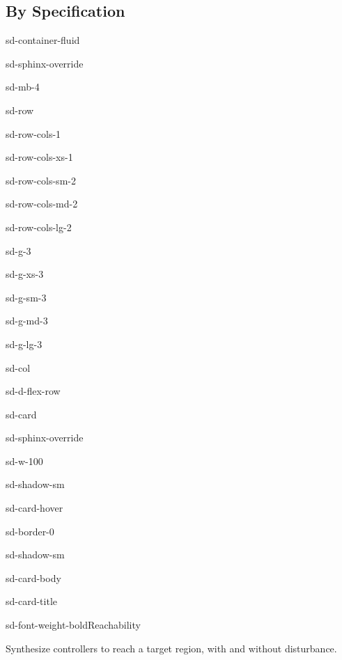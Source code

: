 \documentclass[a4paper,10pt,english]{sphinxmanual}
\begin{document}
\subsection{By Specification}
\label{\detokenize{examples/index:by-specification}}
\begin{sphinxuseclass}{sd-container-fluid}
\begin{sphinxuseclass}{sd-sphinx-override}
\begin{sphinxuseclass}{sd-mb-4}
\begin{sphinxuseclass}{sd-row}
\begin{sphinxuseclass}{sd-row-cols-1}
\begin{sphinxuseclass}{sd-row-cols-xs-1}
\begin{sphinxuseclass}{sd-row-cols-sm-2}
\begin{sphinxuseclass}{sd-row-cols-md-2}
\begin{sphinxuseclass}{sd-row-cols-lg-2}
\begin{sphinxuseclass}{sd-g-3}
\begin{sphinxuseclass}{sd-g-xs-3}
\begin{sphinxuseclass}{sd-g-sm-3}
\begin{sphinxuseclass}{sd-g-md-3}
\begin{sphinxuseclass}{sd-g-lg-3}
\begin{sphinxuseclass}{sd-col}
\begin{sphinxuseclass}{sd-d-flex-row}
\begin{sphinxuseclass}{sd-card}
\begin{sphinxuseclass}{sd-sphinx-override}
\begin{sphinxuseclass}{sd-w-100}
\begin{sphinxuseclass}{sd-shadow-sm}
\begin{sphinxuseclass}{sd-card-hover}
\begin{sphinxuseclass}{sd-border-0}
\begin{sphinxuseclass}{sd-shadow-sm}
\begin{sphinxuseclass}{sd-card-body}
\begin{sphinxuseclass}{sd-card-title}
\begin{sphinxuseclass}{sd-font-weight-bold}Reachability
\end{sphinxuseclass}
\end{sphinxuseclass}
\sphinxAtStartPar
Synthesize controllers to reach a target region, with and without disturbance.


\end{sphinxuseclass}
\end{sphinxuseclass}
\end{sphinxuseclass}
\end{sphinxuseclass}
\end{sphinxuseclass}
\end{sphinxuseclass}
\end{sphinxuseclass}
\end{sphinxuseclass}
\end{sphinxuseclass}
\end{sphinxuseclass}
\end{sphinxuseclass}
\end{sphinxuseclass}
\end{sphinxuseclass}
\end{sphinxuseclass}
\end{sphinxuseclass}
\end{sphinxuseclass}
\end{sphinxuseclass}
\end{sphinxuseclass}
\end{sphinxuseclass}
\end{sphinxuseclass}
\end{sphinxuseclass}
\end{sphinxuseclass}
\end{sphinxuseclass}
\end{sphinxuseclass}
\end{document}
